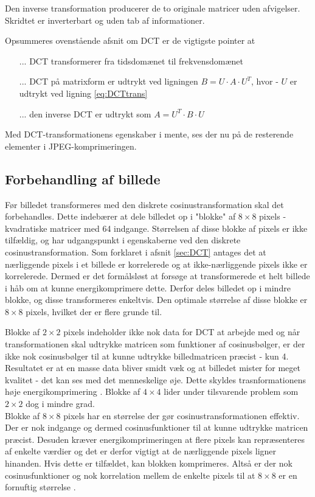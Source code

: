 Den inverse transformation producerer de to originale matricer uden afvigelser. Skridtet er inverterbart og uden tab af informationer.

Opsummeres ovenstående afsnit om DCT er de vigtigste pointer at
\begin{itemize}
\item[...] DCT transformerer fra tidsdomænet til frekvensdomænet
\item[...] DCT på matrixform er udtrykt ved ligningen $B=U \cdot A \cdot U^T$, hvor
\subitem - $U$ er udtrykt ved ligning \vref{eq:DCTtrans}
\item[...] den inverse DCT er udtrykt som $A = U^T \cdot B \cdot U$ 
\end{itemize}

Med DCT-transformationens egenskaber i mente, ses der nu på de resterende elementer i JPEG-komprimeringen. 

\subsection{Forbehandling af billede} \label{sec:preprocessing}
Før billedet transformeres med den diskrete cosinustransformation skal det forbehandles. Dette indebærer at dele billedet op i "blokke" af $8\times8$ pixels - kvadratiske matricer med 64 indgange. Størrelsen af disse blokke af pixels er ikke tilfældig, og har udgangspunkt i egenskaberne ved den diskrete cosinustransformation. Som forklaret i afsnit \vref{sec:DCT} antages det at nærliggende pixels i et billede er korrelerede og at ikke-nærliggende pixels ikke er korrelerede. Dermed er det formålsløst at forsøge at transformerede et helt billede i håb om at kunne energikomprimere dette. Derfor deles billedet op i mindre blokke, og disse transformeres enkeltvis. Den optimale størrelse af disse blokke er $8 \times 8$ pixels, hvilket der er flere grunde til.

Blokke af $2\times2$ pixels indeholder ikke nok data for DCT at arbejde med og når transformationen skal udtrykke matricen som funktioner af cosinusbølger, er der ikke nok cosinusbølger til at kunne udtrykke billedmatricen præcist - kun 4. Resultatet er at en masse data bliver smidt væk og at billedet mister for meget kvalitet - det kan ses med det menneskelige øje. Dette skyldes trasnformationens høje energikomprimering \citep{guillermo_sapiro}. Blokke af $4\times4$ lider under tilsvarende problem som $2\times2$ dog i mindre grad.\\
Blokke af $8\times8$ pixels har en størrelse der gør cosinustransformationen effektiv. Der er nok indgange og dermed cosinusfunktioner til at kunne udtrykke matricen præcist. Desuden kræver energikomprimeringen at flere pixels kan repræsenteres af enkelte værdier og det er derfor vigtigt at de nærliggende pixels ligner hinanden. Hvis dette er tilfældet, kan blokken komprimeres. Altså er der nok cosinusfunktioner og nok korrelation mellem de enkelte pixels til at $8 \times 8$ er en fornuftig størrelse \citep{guillermo_sapiro}.

